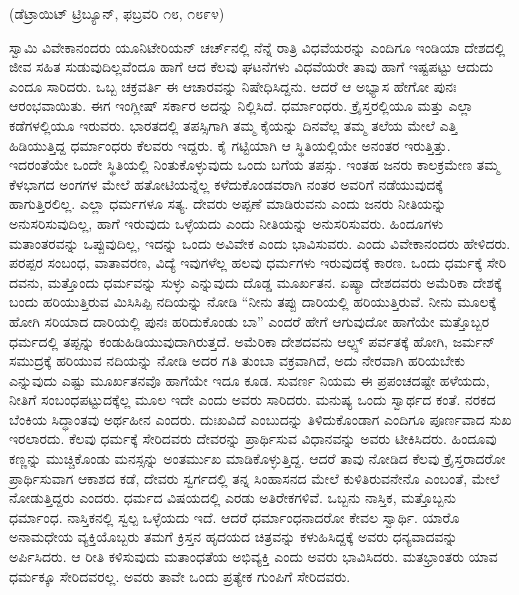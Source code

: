 \delimiter

\begin{center}
(ಡೆಟ್ರಾಯಿಟ್​ ಟ್ರಿಬ್ಯೂನ್​, ಫಬ್ರವರಿ ೧೮, ೧೮೯೪)
\end{center}

ಸ್ವಾಮಿ ವಿವೇಕಾನಂದರು ಯೂನಿಟೇರಿಯನ್​ ಚರ್ಚ್​ನಲ್ಲಿ ನೆನ್ನೆ ರಾತ್ರಿ ವಿಧವೆಯರನ್ನು ಎಂದಿಗೂ ಇಂಡಿಯಾ ದೇಶದಲ್ಲಿ ಜೀವ ಸಹಿತ ಸುಡುವುದಿಲ್ಲವೆಂದೂ ಹಾಗೆ ಆದ ಕೆಲವು ಘಟನೆಗಳು ವಿಧವೆಯರೇ ತಾವು ಹಾಗೆ ಇಷ್ಟಪಟ್ಟು ಆದುದು ಎಂದೂ ಸಾರಿದರು. ಒಬ್ಬ ಚಕ್ರವರ್ತಿ ಈ ಆಚಾರವನ್ನು ನಿಷೇಧಿಸಿದ್ದನು. ಆದರೆ ಆ ಅಭ್ಯಾಸ ಹೇಗೋ ಪುನಃ ಆರಂಭವಾಯಿತು. ಈಗ ಇಂಗ್ಲೀಷ್​ ಸರ್ಕಾರ ಅದನ್ನು ನಿಲ್ಲಿಸಿದೆ. ಧರ್ಮಾಂಧರು. ಕ್ರೈಸ್ತರಲ್ಲಿಯೂ ಮತ್ತು ಎಲ್ಲಾ ಕಡೆಗಳಲ್ಲಿಯೂ ಇರುವರು. ಭಾರತದಲ್ಲಿ ತಪಸ್ಸಿಗಾಗಿ ತಮ್ಮ ಕೈಯನ್ನು ದಿನವೆಲ್ಲ ತಮ್ಮ ತಲೆಯ ಮೇಲೆ ಎತ್ತಿ ಹಿಡಿಯುತ್ತಿದ್ದ ಧರ್ಮಾಂಧರು ಕೆಲವರು ಇದ್ದರು. ಕೈ ಗಟ್ಟಿಯಾಗಿ ಆ ಸ್ಥಿತಿಯಲ್ಲಿಯೇ ಅನಂತರ ಇರುತ್ತಿತ್ತು. ಇದರಂತೆಯೇ ಒಂದೇ ಸ್ಥಿತಿಯಲ್ಲಿ ನಿಂತುಕೊಳ್ಳುವುದು ಒಂದು ಬಗೆಯ ತಪಸ್ಸು. ಇಂತಹ ಜನರು ಕಾಲಕ್ರಮೇಣ ತಮ್ಮ ಕೆಳಭಾಗದ ಅಂಗಗಳ ಮೇಲೆ ಹತೋಟಿಯನ್ನೆಲ್ಲ ಕಳೆದುಕೊಂಡವರಾಗಿ ನಂತರ ಅವರಿಗೆ ನಡೆಯುವುದಕ್ಕೆ ಹಾಗುತ್ತಿರಲಿಲ್ಲ. ಎಲ್ಲಾ ಧರ್ಮಗಳೂ ಸತ್ಯ. ದೇವರು ಅಪ್ಪಣೆ ಮಾಡಿರುವನು ಎಂದು ಜನರು ನೀತಿಯನ್ನು ಅನುಸರಿಸುವುದಿಲ್ಲ, ಹಾಗೆ ಇರುವುದು ಒಳ್ಳೆಯದು ಎಂದು ನೀತಿಯನ್ನು ಅನುಸರಿಸುವರು. ಹಿಂದೂಗಳು ಮತಾಂತರವನ್ನು ಒಪ್ಪುವುದಿಲ್ಲ, ಇದನ್ನು ಒಂದು ಅವಿವೇಕ ಎಂದು ಭಾವಿಸುವರು. ಎಂದು ವಿವೇಕಾನಂದರು ಹೇಳಿದರು. ಪರಪ್ಪರ ಸಂಬಂಧ, ವಾತಾವರಣ, ವಿದ್ಯೆ ಇವುಗಳೆಲ್ಲ ಹಲವು ಧರ್ಮಗಳು ಇರುವುದಕ್ಕೆ ಕಾರಣ. ಒಂದು ಧರ್ಮಕ್ಕೆ ಸೇರಿ ದವನು, ಮತ್ತೊಂದು ಧರ್ಮವನ್ನು ಸುಳ್ಳು ಎನ್ನುವುದು ದೊಡ್ಡ ಮೂರ್ಖತನ. ಏಷ್ಯಾ ದೇಶದವರು ಅಮೆರಿಕಾ ದೇಶಕ್ಕೆ ಬಂದು ಹರಿಯುತ್ತಿರುವ ಮಿಸಿಸಿಪ್ಪಿ ನದಿಯನ್ನು ನೋಡಿ “ನೀನು ತಪ್ಪು ದಾರಿಯಲ್ಲಿ ಹರಿಯುತ್ತಿರುವೆ. ನೀನು ಮೂಲಕ್ಕೆ ಹೋಗಿ ಸರಿಯಾದ ದಾರಿಯಲ್ಲಿ ಪುನಃ ಹರಿದುಕೊಂಡು ಬಾ” ಎಂದರೆ ಹೇಗೆ ಆಗುವುದೋ ಹಾಗೆಯೇ ಮತ್ತೊಬ್ಬರ ಧರ್ಮದಲ್ಲಿ ತಪ್ಪನ್ನು ಕಂಡುಹಿಡಿಯುವುದಾಗಿರುತ್ತದೆ. ಅಮೆರಿಕಾ ದೇಶದವನು ಆಲ್ಪ್ಸ್​ ಪರ್ವತಕ್ಕೆ ಹೋಗಿ, ಜರ್ಮನ್​ ಸಮುದ್ರಕ್ಕೆ ಹರಿಯುವ ನದಿಯನ್ನು ನೋಡಿ ಅದರ ಗತಿ ತುಂಬಾ ವಕ್ರವಾಗಿದೆ, ಅದು ನೇರವಾಗಿ ಹರಿಯಬೇಕು ಎನ್ನುವುದು ಎಷ್ಟು ಮೂರ್ಖತನವೊ ಹಾಗೆಯೇ ಇದೂ ಕೂಡ. ಸುವರ್ಣ ನಿಯಮ ಈ ಪ್ರಪಂಚದಷ್ಟೇ ಹಳೆಯದು, ನೀತಿಗೆ ಸಂಬಂಧಪಟ್ಟುದಕ್ಕೆಲ್ಲ ಮೂಲ ಇದೇ ಎಂದು ಅವರು ಸಾರಿದರು. ಮನುಷ್ಯ ಒಂದು ಸ್ವಾರ್ಥದ ಕಂತೆ. ನರಕದ ಬೆಂಕಿಯ ಸಿದ್ಧಾಂತವು ಅರ್ಥಹೀನ ಎಂದರು. ದುಃಖವಿದೆ ಎಂಬುದನ್ನು ತಿಳಿದುಕೊಂಡಾಗ ಎಂದಿಗೂ ಪೂರ್ಣವಾದ ಸುಖ ಇರಲಾರದು. ಕೆಲವು ಧರ್ಮಕ್ಕೆ ಸೇರಿದವರು ದೇವರನ್ನು ಪ್ರಾರ್ಥಿಸುವ ವಿಧಾನವನ್ನು ಅವರು ಟೀಕಿಸಿದರು. ಹಿಂದೂವು ಕಣ್ಣನ್ನು ಮುಚ್ಚಿಕೊಂಡು ಮನಸ್ಸನ್ನು ಅಂತರ್ಮುಖ ಮಾಡಿಕೊಳ್ಳುತ್ತಿದ್ದ. ಆದರೆ ತಾವು ನೋಡಿದ ಕೆಲವು ಕ್ರೈಸ್ತರಾದರೋ ಪ್ರಾರ್ಥಿಸುವಾಗ ಆಕಾಶದ ಕಡೆ, ದೇವರು ಸ್ವರ್ಗದಲ್ಲಿ ತನ್ನ ಸಿಂಹಾಸನದ ಮೇಲೆ ಕುಳಿತಿರುವನೇನೊ ಎಂಬಂತೆ, ಮೇಲೆ ನೋಡುತ್ತಿದ್ದರು ಎಂದರು. ಧರ್ಮದ ವಿಷಯದಲ್ಲಿ ಎರಡು ಅತಿರೇಕಗಳಿವೆ. ಒಬ್ಬನು ನಾಸ್ತಿಕ, ಮತ್ತೊಬ್ಬನು ಧರ್ಮಾಂಧ. ನಾಸ್ತಿಕನಲ್ಲಿ ಸ್ವಲ್ಪ ಒಳ್ಳೆಯದು ಇದೆ. ಆದರೆ ಧರ್ಮಾಂಧನಾದರೋ ಕೇವಲ ಸ್ವಾರ್ಥಿ. ಯಾರೊ ಅನಾಮಧೇಯ ವ್ಯಕ್ತಿಯೊಬ್ಬರು ತಮಗೆ ಕ್ರಿಸ್ತನ ಹೃದಯದ ಚಿತ್ರವನ್ನು ಕಳುಹಿಸಿದ್ದಕ್ಕೆ ಅವರು ಧನ್ಯವಾದವನ್ನು ಅರ್ಪಿಸಿದರು. ಆ ರೀತಿ ಕಳಿಸುವುದು ಮತಾಂಧತೆಯ ಅಭಿವ್ಯಕ್ತಿ ಎಂದು ಅವರು ಭಾವಿಸಿದರು. ಮತಭ್ರಾಂತರು ಯಾವ ಧರ್ಮಕ್ಕೂ ಸೇರಿದವರಲ್ಲ. ಅವರು ತಾವೇ ಒಂದು ಪ್ರತ್ಯೇಕ ಗುಂಪಿಗೆ ಸೇರಿದವರು.

